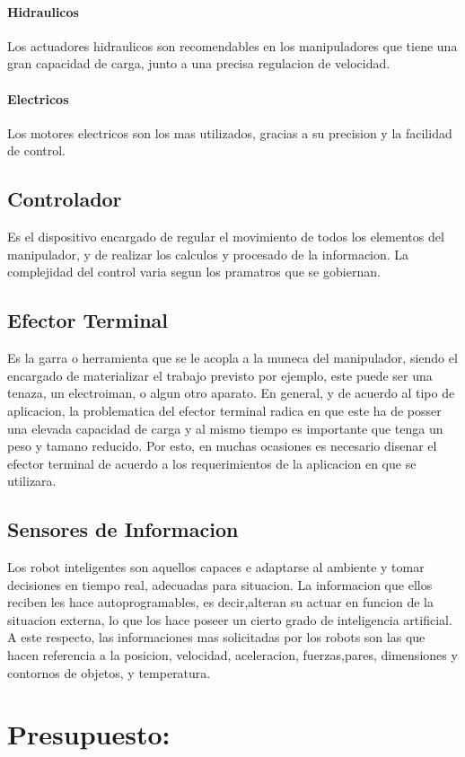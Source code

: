 \documentclass[14pt,a4paper]{article}
\begin{document}
\paragraph{Hidraulicos}
Los actuadores hidraulicos son recomendables en los manipuladores que tiene una gran capacidad de carga, junto a una precisa regulacion de velocidad.
\paragraph{Electricos}
Los motores electricos son los mas utilizados, gracias a su precision y la facilidad de control.
\subsection{Controlador}
Es el dispositivo encargado de regular el movimiento de todos los elementos del manipulador, y de realizar los calculos y procesado de la informacion. La complejidad del control varia segun los pramatros que se gobiernan.
\subsection{Efector Terminal}
Es la garra o herramienta que se le acopla a la muneca del manipulador, siendo el encargado de materializar el trabajo previsto por ejemplo, este puede ser una tenaza, un electroiman, o algun otro aparato. En general, y de acuerdo al tipo de aplicacion, la problematica del efector terminal radica en que este ha de posser una elevada capacidad de carga y al mismo tiempo es importante que tenga un peso y tamano reducido. Por esto, en muchas ocasiones es necesario disenar el efector terminal de acuerdo a los requerimientos de la aplicacion en que se utilizara.
\subsection{Sensores de Informacion}
Los robot inteligentes son aquellos capaces e adaptarse al ambiente y tomar decisiones en tiempo real, adecuadas para situacion. La informacion que ellos reciben les hace autoprogramables, es decir,alteran su actuar en funcion de la situacion externa, lo que los hace poseer un cierto grado de inteligencia artificial. A este respecto, las informaciones mas solicitadas por los robots son las que hacen referencia a la posicion, velocidad, aceleracion, fuerzas,pares, dimensiones y contornos de objetos, y temperatura.

\section{Presupuesto:}
\end{document}
